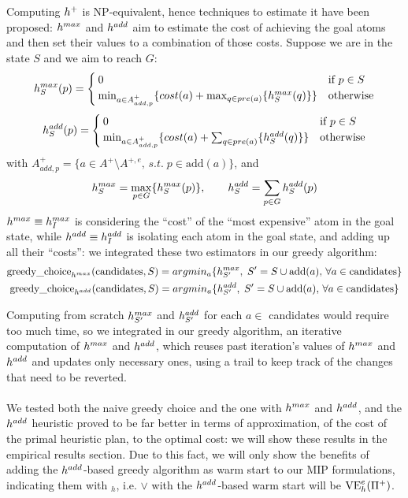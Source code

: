 Computing $h^+$ is NP-equivalent, hence techniques to estimate it have been proposed: $h^{max}$ and $h^{add}$ \cite{Bonet_01} aim to estimate the cost of achieving the goal atoms and then set their values to a combination of those costs.
Suppose we are in the state $S$ and we aim to reach $G$:
$$h^{max}_S(p)=\begin{cases}
    0&\mbox{if }p\in S\\
    \min_{a\in A^+_{add,p}}\{cost(a)+\max_{q\in pre(a)}\{h^{max}_S(q)\}\}&\mbox{otherwise}
\end{cases}$$
$$h^{add}_S(p)=\begin{cases}
    0&\mbox{if }p\in S\\
    \min_{a\in A^+_{add,p}}\{cost(a)+\sum_{q\in pre(a)}\{h^{add}_S(q)\}\}&\mbox{otherwise}
\end{cases}$$
with $A^+_{add,p}=\{a\in A^+\setminus A^{+,e},\,s.t.\;p\in\mbox{add}(a)\}$, and
$$h^{max}_S=\max_{p\in G}\{h^{max}_S(p)\},\qquad h^{add}_S=\sum_{p\in G}h^{add}_S(p)$$
$h^{max}\equiv h^{max}_I$ is considering the ``cost'' of the ``most expensive'' atom in the goal state, while $h^{add}\equiv h^{add}_I$ is isolating each atom in the goal state, and adding up all their ``costs'': we integrated these two estimators in our greedy algorithm:
\begin{gather*}
    \mbox{greedy\_choice}_{h^{max}}(\mbox{candidates}, S)=argmin_a\{h^{max}_{S'},\;S'=S\cup\mbox{add}(a),\,\forall a\in\mbox{candidates}\}\\
    \mbox{greedy\_choice}_{h^{add}}(\mbox{candidates}, S)=argmin_a\{h^{add}_{S'},\;S'=S\cup\mbox{add}(a),\,\forall a\in\mbox{candidates}\}
\end{gather*}

Computing from scratch $h^{max}_{S'}$ and $h^{add}_{S'}$ for each $a\in$ candidates would require too much time, so we integrated in our greedy algorithm, an iterative computation of $h^{max}$ and $h^{add}$, which reuses past iteration's values of $h^{max}$ and $h^{add}$ and updates only necessary ones, using a trail to keep track of the changes that need to be reverted.\\
\\
We tested both the naive greedy choice and the one with $h^{max}$ and $h^{add}$, and the $h^{add}$ heuristic proved to be far better in terms of approximation, of the cost of the primal heuristic plan, to the optimal cost: we will show these results in the empirical results section.
Due to this fact, we will only show the benefits of adding the $h^{add}$-based greedy algorithm as warm start to our MIP formulations, indicating them with $_h$, i.e. $\vee$ with the $h^{add}$-based warm start will be $\mbox{VE}^e_h(\Pi^+)$.
